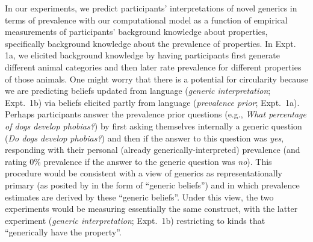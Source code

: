 \documentclass[floatsintext,doc]{apa6}
\begin{document}
In our experiments, we predict participants' interpretations of novel generics in terms of prevalence with our computational model as a function of empirical measurements of participants' background knowledge about properties, specifically background knowledge about the prevalence of properties. 
In Expt. 1a, we elicited background knowledge by having participants first generate different animal categories and then later rate prevalence for different properties of those animals.
One might worry that there is a potential for circularity because we are predicting beliefs updated from language (\emph{generic interpretation}; Expt.~1b) via beliefs elicited partly from language (\emph{prevalence prior}; Expt.~1a).
Perhaps participants answer the prevalence prior questions (e.g., \emph{What percentage of dogs develop phobias?}) by first asking themselves internally a generic question (\emph{Do dogs develop phobias?}) and then  if the answer to this question was \emph{yes}, responding with their personal (already generically-interpreted) prevalence (and rating 0\% prevalence if the answer to the generic question was \emph{no}).
This procedure would be consistent with a view of generics as representationally primary (as posited by  in the form of \enquote{generic beliefs}) and in which prevalence estimates are derived by these \enquote{generic beliefs}. 
Under this view, the two experiments would be measuring essentially the same construct, with the latter experiment (\emph{generic interpretation}; Expt.~1b) restricting to  kinds that ``generically have the property''. 
\end{document}
